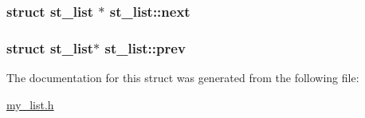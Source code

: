 \subsubsection[{next}]{\setlength{\rightskip}{0pt plus 5cm}struct {\bf st\+\_\+list} $\ast$ st\+\_\+list\+::next}\label{structst__list_a2df21777b3d410ab0803ee9046b3764e}
\hypertarget{structst__list_a53506b20583b3dfd486ff9f60f1450da}{}
\subsubsection[{prev}]{\setlength{\rightskip}{0pt plus 5cm}struct {\bf st\+\_\+list}$\ast$ st\+\_\+list\+::prev}\label{structst__list_a53506b20583b3dfd486ff9f60f1450da}


The documentation for this struct was generated from the following file\+:\begin{DoxyCompactItemize}
\item 
\hyperlink{my__list_8h}{my\+\_\+list.\+h}\end{DoxyCompactItemize}
